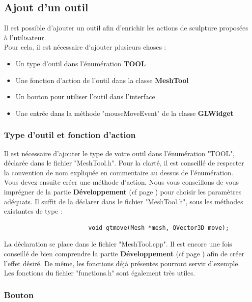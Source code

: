 \documentclass[a4paper]{memoir}
\begin{document}
			\subsection{Ajout d'un outil}
				Il est possible d'ajouter un outil afin d'enrichir les actions de sculpture proposées à l'utilisateur.\\
				Pour cela, il est nécessaire d'ajouter plusieurs choses :
				\begin{itemize}
					\item Un type d'outil dans l'énumération \textbf{TOOL}
					\item Une fonction d'action de l'outil dans la classe \textbf{MeshTool}
					\item Un bouton pour utiliser l'outil dans l'interface
					\item Une entrée dans la méthode "mouseMoveEvent" de la classe \textbf{GLWidget}
				\end{itemize}
				
				\subsubsection{Type d'outil et fonction d'action}
					Il est nécessaire d'ajouter le type de votre outil dans l'énumération "TOOL", déclarée dans le fichier "MeshTool.h". Pour la clarté, il 
					est conseillé de respecter la convention de nom expliquée en commentaire au dessus de l'énumération.\\
					Vous devez ensuite créer une méthode d'action. Nous vous conseillons de vous imprégner de la partie \textbf{Développement} (cf page 
					\pageref{tool-dev}) pour choisir les paramètres adéquats. Il suffit de la déclarer dans le fichier "MeshTool.h", sous les méthodes 
					existantes de type :
					\begin{verbatim}
						void gtmove(Mesh *mesh, QVector3D move);
					\end{verbatim}
					La déclaration se place dans le fichier "MeshTool.cpp". Il est encore une fois conseillé de bien comprendre la partie 
					\textbf{Développement} (cf page \pageref{tool-dev}) afin de créer l'effet désiré. De même, les fonctions déjà présentes pourront servir 
					d'exemple. Les fonctions du fichier "functions.h" sont également très utiles.
					
				\subsubsection{Bouton}
					
\end{document}
